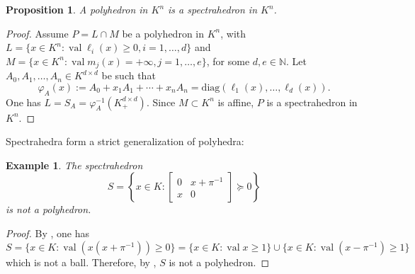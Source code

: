 \documentclass[a4paper,12pt]{article}
\newtheorem{proposition}[theorem]{Proposition}
\newtheorem{example}[theorem]{Example}
\renewcommand{\span}[1]{{\text{span}(#1)}} %
\DeclareMathOperator{\val}{val}
\def\diag{\mathrm{diag}}
\begin{document}
\begin{proposition}
  A polyhedron in $K^n$ is a spectrahedron in $K^n$.
\end{proposition}
\begin{proof}
  Assume $P = L \cap M$ be a polyhedron in $K^n$, with
  $L = \{x \in K^n : \val \ell_i(x) \geq 0, i=1, \ldots, d\}$
  and $M = \{x \in K^n : \val m_j(x) = +\infty, j=1, \ldots, e\}$,
  for some $d, e \in \mathbb{N}$.
  Let $A_0,A_1,\ldots,A_n \in K^{d \times d}$ be such that
  $$
  \varphi_A(x) := A_0+x_1A_1+\cdots+x_nA_n = \diag(\ell_1(x), \ldots, \ell_d(x)).
  $$
  One has $L = S_A = \varphi_A^{-1}(K^{d \times d}_+)$. Since $M \subset K^n$ is affine, 
  $P$ is a spectrahedron in $K^n$.
%
\end{proof}

Spectrahedra form a strict generalization of polyhedra:

\begin{example}
  The spectrahedron
  \[
  S = \left\{x \in K : \begin{bmatrix} 0 & x + \pi^{-1} \\ x & 0 \end{bmatrix} \succeq 0\right\}
  \] 
  is not a polyhedron.
\end{example}
\begin{proof}
  By , one has $S = \{x \in K : \val(x(x + \pi^{-1})) \geq 0\} =
  \{x \in K: \val x \ge 1\} \cup \{x \in K: \val (x - \pi^{-1}) \ge 1\}$ which is not a ball.
  Therefore, by , $S$ is not a polyhedron.
\end{proof}
\end{document}
